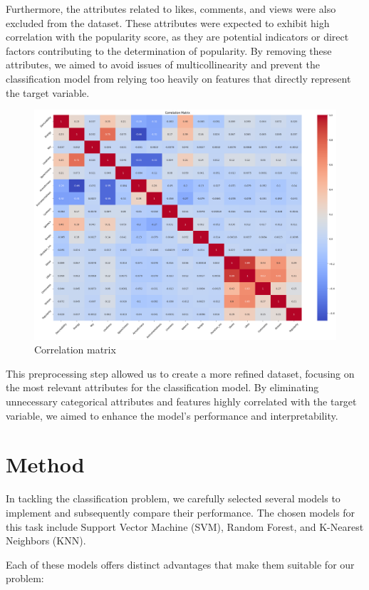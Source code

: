 \documentclass[11pt]{article} %
\begin{document}
Furthermore, the attributes related to likes, comments, and views were also excluded from the dataset. These attributes were expected to exhibit high correlation with the popularity score, as they are potential indicators or direct factors contributing to the determination of popularity. By removing these attributes, we aimed to avoid issues of multicollinearity and prevent the classification model from relying too heavily on features that directly represent the target variable.

\begin{figure}[H]
	\centering
	\includegraphics[width=.8\linewidth]{correlation_matrix.png}
	\caption{Correlation matrix}\label{fig:correlation_matrix}
\end{figure}

This preprocessing step allowed us to create a more refined dataset, focusing on the most relevant attributes for the classification model. By eliminating unnecessary categorical attributes and features highly correlated with the target variable, we aimed to enhance the model's performance and interpretability.


\section{Method}

In tackling the classification problem, we carefully selected several models to implement and subsequently compare their performance. The chosen models for this task include Support Vector Machine (SVM), Random Forest, and K-Nearest Neighbors (KNN).

Each of these models offers distinct advantages that make them suitable for our problem:
\end{document}
